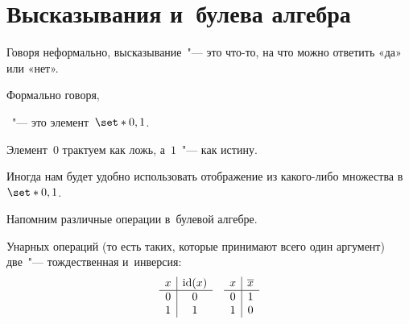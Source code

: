 
\section{Высказывания и~булева алгебра}

Говоря неформально, высказывание~"--- это что-то, на что можно ответить «да» или «нет».

Формально говоря,
\begin{definition}
	~"--- это элемент~$\set*{0, 1}$.
\end{definition}

Элемент~$0$ трактуем как ложь, а~$1$~"--- как истину.

Иногда нам будет удобно использовать отображение из какого-либо множества в~$\set*{0, 1}$.


Напомним различные операции в~булевой алгебре.

Унарных операций (то есть таких, которые принимают всего один аргумент) две~"--- тождественная и~инверсия:
\begin{align*}
	\begin{array}{c|c}
		x & \mathop{\mathrm{id}}\nolimits(x)
		\\\hline
		0 & 0
		\\
		1 & 1
	\end{array}
	&&
	\begin{array}{c|c}
		x & \overline{x}
		\\\hline
		0 & 1
		\\
		1 & 0
	\end{array}
\end{align*}

